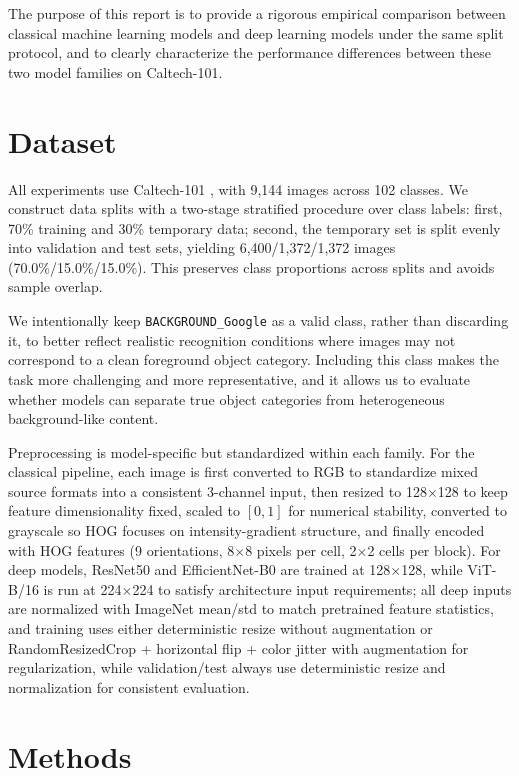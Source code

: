 \documentclass[11pt]{article}
\begin{document}
The purpose of this report is to provide a rigorous empirical comparison between classical machine learning models and deep learning models under the same split protocol, and to clearly characterize the performance differences between these two model families on Caltech-101.

\section{Dataset}
All experiments use Caltech-101 \cite{feifei2004caltech101}, with 9,144 images across 102 classes. We construct data splits with a two-stage stratified procedure over class labels: first, 70\% training and 30\% temporary data; second, the temporary set is split evenly into validation and test sets, yielding 6,400/1,372/1,372 images (70.0\%/15.0\%/15.0\%). This preserves class proportions across splits and avoids sample overlap.

We intentionally keep \texttt{BACKGROUND\_Google} as a valid class, rather than discarding it, to better reflect realistic recognition conditions where images may not correspond to a clean foreground object category. Including this class makes the task more challenging and more representative, and it allows us to evaluate whether models can separate true object categories from heterogeneous background-like content.

Preprocessing is model-specific but standardized within each family. For the classical pipeline, each image is first converted to RGB to standardize mixed source formats into a consistent 3-channel input, then resized to 128$\times$128 to keep feature dimensionality fixed, scaled to $[0,1]$ for numerical stability, converted to grayscale so HOG focuses on intensity-gradient structure, and finally encoded with HOG features (9 orientations, 8$\times$8 pixels per cell, 2$\times$2 cells per block). For deep models, ResNet50 and EfficientNet-B0 are trained at 128$\times$128, while ViT-B/16 is run at 224$\times$224 to satisfy architecture input requirements; all deep inputs are normalized with ImageNet mean/std to match pretrained feature statistics, and training uses either deterministic resize without augmentation or RandomResizedCrop + horizontal flip + color jitter with augmentation for regularization, while validation/test always use deterministic resize and normalization for consistent evaluation.

\section{Methods}
\end{document}
